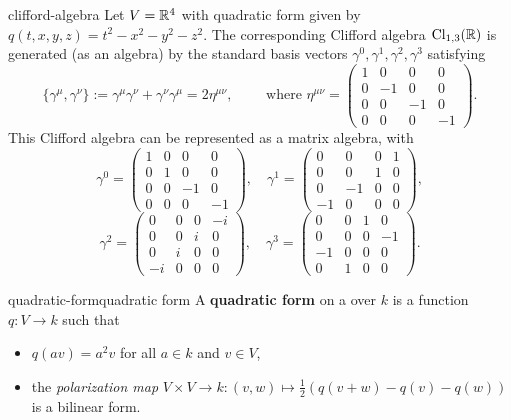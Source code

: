 \begin{example}{clifford-algebra}
    Let $V = \mathbb{R}^4$ with quadratic form given by $q(t, x, y, z) = t^2 - x^2 - y^2 - z^2$. The corresponding Clifford algebra $\textup{Cl}_{1,3}(\mathbb{R})$ is generated (as an algebra) by the standard basis vectors $\gamma^0, \gamma^1, \gamma^2, \gamma^3$ satisfying
    \[ \{ \gamma^\mu, \gamma^\nu \} := \gamma^\mu \gamma^\nu + \gamma^\nu \gamma^\mu = 2 \eta^{\mu \nu} , \qquad \text{ where } \eta^{\mu \nu} = \begin{pmatrix} 1 & 0 & 0 & 0 \\ 0 & -1 & 0 & 0 \\ 0 & 0 & -1 & 0 \\ 0 & 0 & 0 & -1 \end{pmatrix} . \]
    This Clifford algebra can be represented as a matrix algebra, with
    \[
        \gamma^0 = \begin{pmatrix} 1 & 0 & 0 & 0 \\ 0 & 1 & 0 & 0 \\ 0 & 0 & -1 & 0 \\ 0 & 0 & 0 & -1 \end{pmatrix} , \quad
        \gamma^1 = \begin{pmatrix} 0 & 0 & 0 & 1 \\ 0 & 0 & 1 & 0 \\ 0 & -1 & 0 & 0 \\ -1 & 0 & 0 & 0 \end{pmatrix} , \]
    \[
        \gamma^2 = \begin{pmatrix} 0 & 0 & 0 & -i \\ 0 & 0 & i & 0 \\ 0 & i & 0 & 0 \\ -i & 0 & 0 & 0 \end{pmatrix} , \quad
        \gamma^3 = \begin{pmatrix} 0 & 0 & 1 & 0 \\ 0 & 0 & 0 & -1 \\ -1 & 0 & 0 & 0 \\ 0 & 1 & 0 & 0 \end{pmatrix} .
    \]
\end{example}

\begin{topic}{quadratic-form}{quadratic form}
    A \textbf{quadratic form} on a  over $k$ is a function $q : V \to k$ such that
    \begin{itemize}
        \item $q(av) = a^2 v$ for all $a \in k$ and $v \in V$,
        \item the \textit{polarization map} $V \times V \to k : (v, w) \mapsto \frac{1}{2}\left( q(v + w) - q(v) - q(w) \right)$ is a bilinear form.
    \end{itemize}
\end{topic}


